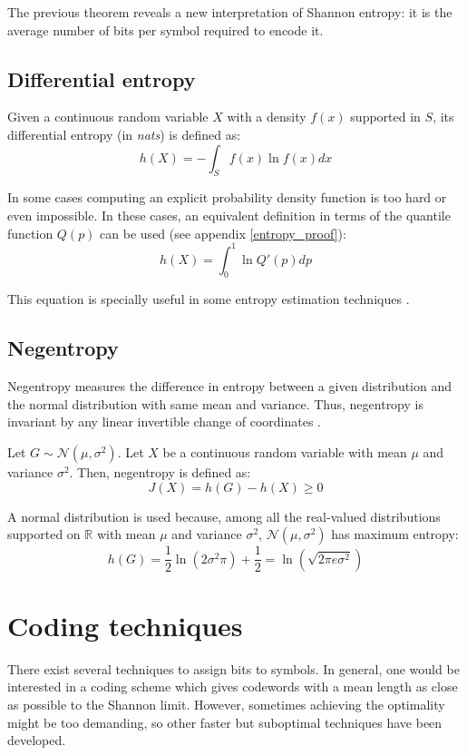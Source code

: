 The previous theorem reveals a new interpretation of Shannon entropy: it is the average number of bits per symbol required to encode it.

\subsection{Differential entropy}
Given a continuous random variable $X$ with a density $f(x)$ supported in $S$, its differential entropy (in \textit{nats}) is defined as:
\begin{equation} \label{eq:differential_entropy}
h(X) = - \int_{S}^{} f(x) \ln f(x) dx
\end{equation}

In some cases computing an explicit probability density function is too hard or even impossible. In these cases, an equivalent definition in terms of the quantile function $Q(p)$ can be used (see appendix \ref{entropy_proof}):
\begin{equation} \label{eq:differential_entropy_q}
h(X) = \int_{0}^{1} \ln Q'(p) dp
\end{equation}

This equation is specially useful in some entropy estimation techniques \parencite{Vasicek}.

\subsection{Negentropy} \label{sec:negentropy}
Negentropy measures the difference in entropy between a given distribution and the normal distribution with same mean and variance. Thus, negentropy is invariant by any linear invertible change of coordinates \parencite{negentropy}. 

Let $G \sim \mathscr{N}(\mu, \sigma^2)$. Let $X$ be a continuous random variable with mean $\mu$ and variance $\sigma^2$. Then, negentropy is defined as:
\begin{equation}
J(X) = h(G) - h(X) \geq 0
\end{equation}

A normal distribution is used because, among all the real-valued distributions supported on $\mathbb{R}$ with mean $\mu$ and variance $\sigma^2$, $\mathscr{N}(\mu, \sigma^2)$ has maximum entropy:
\begin{equation}
h(G) = \frac{1}{2} \ln \left(2\sigma^2\pi\right) + \frac{1}{2} = \ln\left(\sqrt{2\pi e \sigma^2}\right)
\end{equation}

\section{Coding techniques}
There exist several techniques to assign bits to symbols. In general, one would be interested in a coding scheme which gives codewords with a mean length as close as possible to the Shannon limit. However, sometimes achieving the optimality might be too demanding, so other faster but suboptimal techniques have been developed.

